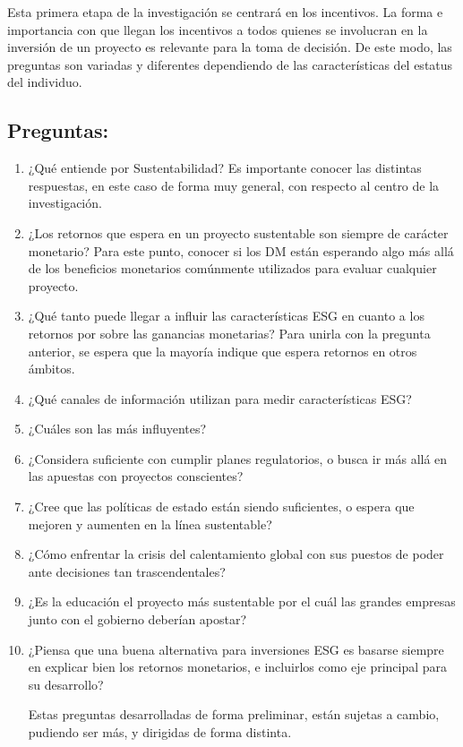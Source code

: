 \documentclass[11pt,letterpaper]{article}
\begin{document}
Esta primera etapa de la investigación se centrará en los incentivos. La forma e importancia con que llegan los incentivos a todos quienes se involucran en la inversión de un proyecto es relevante para la toma de decisión. De este modo, las preguntas son variadas y diferentes dependiendo de las características del estatus del individuo.

\subsection{Preguntas:}

\begin{enumerate}
    \item ¿Qué entiende por Sustentabilidad? Es importante conocer las distintas respuestas, en este caso de forma muy general, con respecto al centro de la investigación.
    \item ¿Los retornos que espera en un proyecto sustentable son siempre de carácter monetario? Para este punto, conocer si los DM están esperando algo más allá de los beneficios monetarios comúnmente utilizados para evaluar cualquier proyecto. 
    \item ¿Qué tanto puede llegar a influir las características ESG en cuanto a los retornos por sobre las ganancias monetarias? Para unirla con la pregunta anterior, se espera que la mayoría indique que espera retornos en otros ámbitos.
    \item ¿Qué canales de información utilizan para medir características ESG?
    \item ¿Cuáles son las más influyentes?
    \item ¿Considera suficiente con cumplir planes regulatorios, o busca ir más allá en las apuestas con proyectos conscientes?
    \item ¿Cree que las políticas de estado están siendo suficientes, o espera que mejoren y aumenten en la línea sustentable?
    \item ¿Cómo enfrentar la crisis del calentamiento global con sus puestos de poder ante decisiones tan trascendentales?
    \item ¿Es la educación el proyecto más sustentable por el cuál las grandes empresas junto con el gobierno deberían apostar?
    \item ¿Piensa que una buena alternativa para inversiones ESG es basarse siempre en explicar bien los retornos monetarios, e incluirlos como eje principal para su desarrollo?
    
Estas preguntas desarrolladas de forma preliminar, están sujetas a cambio, pudiendo ser más, y dirigidas de forma distinta.


\end{enumerate}
\end{document}

